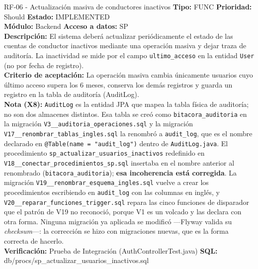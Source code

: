 \documentclass[11pt,a4paper]{article}
\begin{document}
\begin{requisito}{RF-06 - Actualización masiva de conductores inactivos}
    \textbf{Tipo:} FUNC \quad \textbf{Prioridad:} Should \quad \textbf{Estado:} IMPLEMENTED \\[0.2cm]
    \textbf{Módulo:} Backend \quad \textbf{Acceso a datos:} SP \\[0.2cm]
    \textbf{Descripción:} El sistema deberá actualizar periódicamente el estado de las cuentas de conductor inactivos mediante una operación masiva y dejar traza de auditoría. La inactividad se mide por el campo \texttt{ultimo\_acceso} en la entidad \texttt{User} (no por fecha de registro). \\[0.2cm]
    \textbf{Criterio de aceptación:} La operación masiva cambia únicamente usuarios cuyo último acceso supera los 6 meses, conserva los demás registros y guarda un registro en la tabla de auditoría (AuditLog). \\[0.2cm]
    \textbf{Nota (X8):} \texttt{AuditLog} es la entidad JPA que mapea la tabla física de auditoría; no son dos almacenes distintos. Esa tabla se creó como \texttt{bitacora\_auditoria} en la migración \texttt{V3\_\_auditoria\_operaciones.sql} y la migración \texttt{V17\_\_renombrar\_tablas\_ingles.sql} la renombró a \texttt{audit\_log}, que es el nombre declarado en \texttt{@Table(name = "audit\_log")} dentro de \texttt{AuditLog.java}. El procedimiento \texttt{sp\_actualizar\_usuarios\_inactivos} redefinido en \texttt{V18\_\_conectar\_procedimientos\_sp.sql} insertaba en el nombre anterior al renombrado (\texttt{bitacora\_auditoria}); \textbf{esa incoherencia está corregida}. La migración \texttt{V19\_\_renombrar\_esquema\_ingles.sql} vuelve a crear los procedimientos escribiendo en \texttt{audit\_log} con las columnas en inglés, y \texttt{V20\_\_reparar\_funciones\_trigger.sql} repara las cinco funciones de disparador que el patrón de V19 no reconoció, porque V1 es un volcado y las declara con otra forma. Ninguna migración ya aplicada se modificó —Flyway valida su \textit{checksum}—: la corrección se hizo con migraciones nuevas, que es la forma correcta de hacerlo. \\[0.2cm]
    \textbf{Verificación:} Prueba de Integración (AuthControllerTest.java) \quad \textbf{SQL:} db/procs/sp\_actualizar\_usuarios\_inactivos.sql
\end{requisito}
\end{document}
